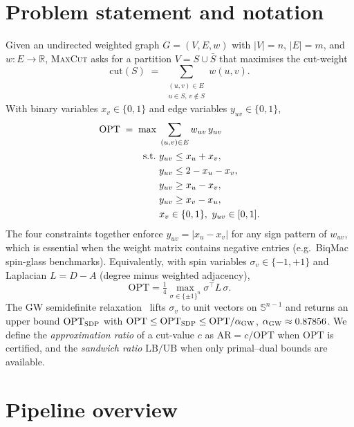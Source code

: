 \documentclass{article}
\theoremstyle{definition}
\theoremstyle{remark}
\newcommand{\MaxCut}{\textsc{MaxCut}\xspace}
\newcommand{\SDP}{\textsc{SDP}\xspace}
\newcommand{\GW}{\textsc{GW}\xspace}
\newcommand{\OPT}{\mathrm{OPT}}
\newcommand{\LB}{\mathrm{LB}}
\newcommand{\UB}{\mathrm{UB}}
\newcommand{\AR}{\mathrm{AR}}
\newcommand{\Reals}{\mathbb{R}}
\begin{document}
\section{Problem statement and notation}
\label{sec:problem}

Given an undirected weighted graph $G = (V, E, w)$ with $|V| = n$,
$|E| = m$, and $w\colon E \to \Reals$, \MaxCut asks for a partition
$V = S \cup \bar S$ that maximises the cut-weight
\begin{equation}
  \mathrm{cut}(S) \;=\; \sum_{\substack{(u,v)\in E \\ u\in S,\, v\notin S}}
      w(u,v).
  \label{eq:cut-weight}
\end{equation}
With binary variables $x_v \in \{0, 1\}$ and edge variables
$y_{uv} \in \{0,1\}$,
\begin{align}
  \OPT \;=\; \max\;   & \sum_{(u,v)\in E} w_{uv}\, y_{uv} \label{eq:milp}\\
  \text{s.t.}\ & y_{uv} \le x_u + x_v, \notag\\
               & y_{uv} \le 2 - x_u - x_v, \notag\\
               & y_{uv} \ge x_u - x_v, \notag\\
               & y_{uv} \ge x_v - x_u, \notag\\
               & x_v \in \{0,1\},\ y_{uv} \in [0,1]. \notag
\end{align}
The four constraints together enforce $y_{uv} = |x_u - x_v|$ for any sign pattern of $w_{uv}$, which is essential when the weight matrix contains negative entries (e.g.\ BiqMac spin-glass benchmarks).
Equivalently, with spin variables $\sigma_v \in \{-1, +1\}$ and Laplacian
$L = D - A$ (degree minus weighted adjacency),
\begin{equation}
  \OPT = \tfrac14 \max_{\sigma\in\{\pm 1\}^n} \sigma^\top L\, \sigma.
  \label{eq:laplacian}
\end{equation}
The \GW semidefinite relaxation~\cite{goemans1995improved} lifts
$\sigma_v$ to unit vectors on $\mathbb{S}^{n-1}$ and returns an upper
bound $\OPT_{\SDP}$ with
$\OPT \le \OPT_{\SDP} \le \OPT / \alpha_{\GW}$,
$\alpha_{\GW} \approx 0.87856$. We define the \emph{approximation ratio}
of a cut-value $c$ as $\AR = c / \OPT$ when $\OPT$ is certified, and the
\emph{sandwich ratio} $\LB / \UB$ when only primal--dual bounds are
available.

\section{Pipeline overview}
\label{sec:pipeline}
\end{document}
